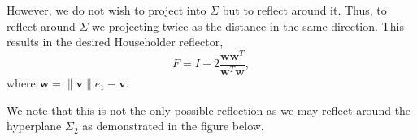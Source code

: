 \documentclass[
]{article}
\theoremstyle{definition}
\theoremstyle{definition}
\begin{document}
\begin{center}

\end{center}

However, we do not wish to project into \(\Sigma\) but to reflect around
it. Thus, to reflect around \(\Sigma\) we projecting twice as the
distance in the same direction. This results in the desired Householder
reflector,
\[F = I - 2 \frac{\mathbf{w} \mathbf{w}^T}{\mathbf{w}^T \mathbf{w}},\]
where \(\mathbf{w} = \|\mathbf{v}\| e_1 - \mathbf{v}\).

We note that this is not the only possible reflection as we may reflect
around the hyperplane \(\Sigma_2\) as demonstrated in the figure below.
\end{document}
